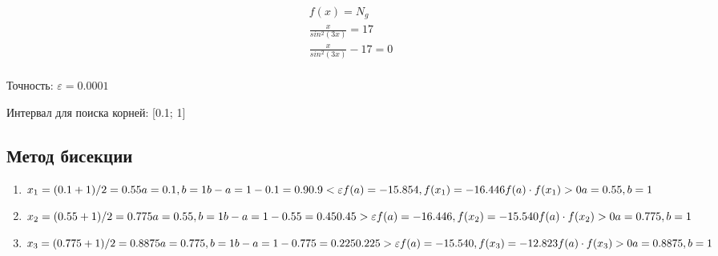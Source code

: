 \documentclass{article}
\begin{document}
\begin{displaymath}
  \begin{array}{ccc}
    f(x) = N_{g}  \\
    \frac{x}{sin^2(3x)}= 17 \\
    \frac{x}{sin^2(3x)} - 17 = 0 \\
  \end{array}
\end{displaymath}

Точность: $\varepsilon = 0.0001$

Интервал для поиска корней: [0.1; 1]

\subsection{Метод бисекции}
\begin{enumerate}[label= итерация \arabic{*}:]
  \item 
  \begin{math}
    x_{1}=(0.1+1)/2=0.55\\
    a=0.1, b=1\\
    b-a=1-0.1= 0.9\\
    0.9 < \varepsilon \\
    f(a)=-15.854, f(x_{1})= -16.446\\
    f(a) \cdot f(x_{1}) > 0\\
    a=0.55, b=1\\
  \end{math}
  
  \item
  \begin{math}
    x_{2}=(0.55+1)/2=0.775\\
    a=0.55, b=1\\
    b-a=1-0.55= 0.45\\
    0.45 > \varepsilon \\
    f(a)=-16.446, f(x_{2})= -15.540\\
    f(a) \cdot f(x_{2}) > 0 \\
    a=0.775, b=1\\
  \end{math}
  
  \item
  \begin{math}
    x_{3}=(0.775+1)/2=0.8875\\
    a=0.775, b=1\\
    b-a=1-0.775= 0.225\\
    0.225 > \varepsilon \\
    f(a)=-15.540, f(x_{3})= -12.823\\
    f(a) \cdot f(x_{3}) > 0 \\
    a=0.8875, b=1\\
  \end{math}
  

\end{enumerate}
\end{document}

